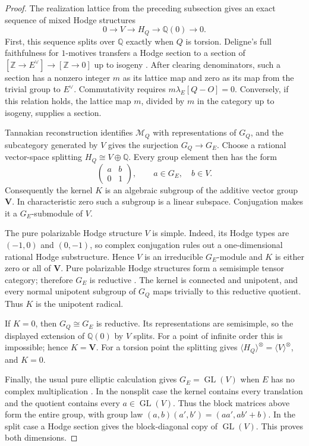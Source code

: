 \documentclass[11pt]{article}
\theoremstyle{definition}
\theoremstyle{remark}
\newcommand{\Q}{\mathbb Q}
\newcommand{\Z}{\mathbb Z}
\begin{document}
\begin{proof}
The realization lattice from the preceding subsection gives an exact
sequence of mixed Hodge structures
\[
 0\longrightarrow V\longrightarrow H_Q\longrightarrow\Q(0)
 \longrightarrow0.
\]
First, this sequence splits over $\Q$ exactly when $Q$ is torsion.
Deligne's full faithfulness for $1$-motives transfers a Hodge section to
a section of $[\Z\to E^\vee]\to[\Z\to0]$ up to isogeny
\cite[\S10.1]{DeligneHodgeIII}.
After clearing denominators, such a section has a nonzero integer $m$
as its lattice map and zero as its map from the trivial group to
$E^\vee$. Commutativity requires
$m\lambda_E[Q-O]=0$. Conversely, if this relation holds, the lattice
map $m$, divided by $m$ in the category up to isogeny, supplies a section.

Tannakian reconstruction identifies $\mathcal M_Q$ with representations
of $G_Q$, and the subcategory generated by $V$ gives the surjection
$G_Q\to G_E$. Choose a rational vector-space splitting
$H_Q\cong V\oplus\Q$. Every group element then has the form
\[
 \begin{pmatrix}a&b\\0&1\end{pmatrix},
 \qquad a\in G_E,\quad b\in V.
\]
Consequently the kernel $K$ is an algebraic subgroup of the additive
vector group $\mathbf V$. In characteristic zero such a subgroup is a
linear subspace. Conjugation makes it a $G_E$-submodule of $V$.

The pure polarizable Hodge structure $V$ is simple. Indeed, its Hodge
types are $(-1,0)$ and $(0,-1)$, so complex conjugation rules out a
one-dimensional rational Hodge substructure. Hence $V$ is an irreducible
$G_E$-module and $K$ is either zero or all of $\mathbf V$.
Pure polarizable Hodge structures form a semisimple tensor category;
therefore $G_E$ is reductive
\cite[\S6, Corollary 6.5]{galoisMilneHodgeGroups}.
The kernel is connected and unipotent, and every normal unipotent
subgroup of $G_Q$ maps trivially to this reductive quotient. Thus $K$ is
the unipotent radical.

If $K=0$, then $G_Q\cong G_E$ is reductive. Its representations are
semisimple, so the displayed extension of $\Q(0)$ by $V$ splits.
For a point of infinite order this is impossible; hence $K=\mathbf V$.
For a torsion point the splitting gives
$\langle H_Q\rangle^\otimes=\langle V\rangle^\otimes$, and $K=0$.

Finally, the usual pure elliptic calculation gives
$G_E=\operatorname{GL}(V)$ when $E$ has no complex multiplication
\cite[Example 5.11]{galoisBertolinPhilippon}.
In the nonsplit case the kernel contains every translation and the
quotient contains every $a\in\operatorname{GL}(V)$. Thus the block
matrices above form the entire group, with group law
$(a,b)(a',b')=(aa',ab'+b)$. In the split case a Hodge section gives the
block-diagonal copy of $\operatorname{GL}(V)$. This proves both dimensions.
\end{proof}
\end{document}
